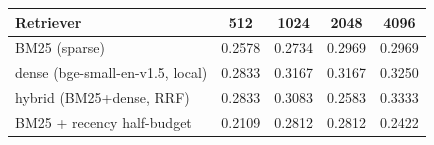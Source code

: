 \begin{tabular}{lcccc}
\toprule
Retriever & 512 & 1024 & 2048 & 4096 \\
\midrule
BM25 (sparse) & 0.2578 & 0.2734 & 0.2969 & 0.2969 \\
dense (bge-small-en-v1.5, local) & 0.2833 & 0.3167 & 0.3167 & 0.3250 \\
hybrid (BM25+dense, RRF) & 0.2833 & 0.3083 & 0.2583 & 0.3333 \\
BM25 + recency half-budget & 0.2109 & 0.2812 & 0.2812 & 0.2422 \\
\bottomrule
\end{tabular}